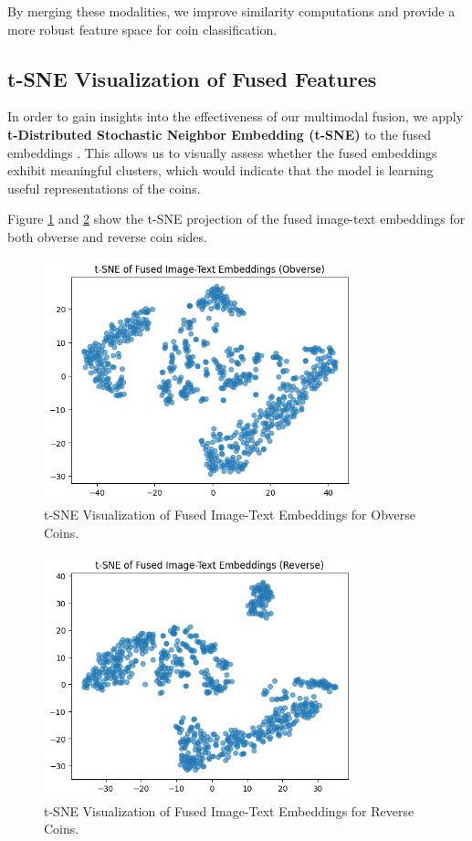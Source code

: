 \documentclass[nolibertine, english, algorithm, nomencl, minted]{ttlab-qualify}
\begin{document}
By merging these modalities, we improve similarity computations and provide a more robust feature space for coin classification.



\subsection{t-SNE Visualization of Fused Features}
In order to gain insights into the effectiveness of our multimodal fusion, 
we apply \textbf{t-Distributed Stochastic Neighbor Embedding (t-SNE)} to the fused embeddings \parencite{van2008visualizing}. 
This allows us to visually assess whether the fused embeddings exhibit meaningful clusters,
which would indicate that the model is learning useful representations of the coins.

Figure \ref{fig:tsne_obverse} and \ref{fig:tsne_reverse} show the t-SNE projection of the fused image-text embeddings 
for both obverse and reverse coin sides.

\begin{figure}[H]
    \centering
    \includegraphics[width=0.8\textwidth]{static/tsne_ob_fused.png}
    \caption{t-SNE Visualization of Fused Image-Text Embeddings for Obverse Coins.}
    \label{fig:tsne_obverse}
\end{figure}

\begin{figure}[H]
    \centering
    \includegraphics[width=0.8\textwidth]{static/tsne_rev_fused.png}
    \caption{t-SNE Visualization of Fused Image-Text Embeddings for Reverse Coins.}
    \label{fig:tsne_reverse}
\end{figure}
\end{document}
